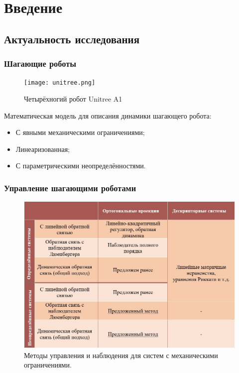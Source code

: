 \section{Введение}

\subsection{Актуальность исследования}

\begin{frame}
	\frametitle{Шагающие роботы}
	    \begin{minipage}[t]{0.47\linewidth}
	    	\begin{figure}
			\texttt{[image: unitree.png]}
			\caption{Четырёхногий робот Unitree A1}
			\end{figure}
	\end{minipage}
	\hfill
	\begin{minipage}[t]{0.47\linewidth}
		Математическая модель для описания динамики шагающего робота:
		\begin{itemize}
			\item С явными механическими ограничениями;
			\item Линеаризованная;
			\item С параметрическими неопределённостями.
		\end{itemize}		
	\end{minipage}
\end{frame}

\begin{frame}
    \frametitle{Управление шагающими роботами}
	\begin{figure}
	\centering
	\includegraphics[scale=0.59]{images/table.JPG}
	\caption{Методы управления и наблюдения для систем с механическими ограничениями.}
	\label{fig:table}
\end{figure}
\end{frame}

